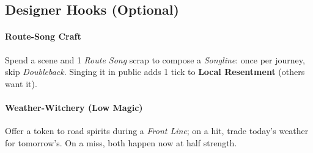 \subsection*{Designer Hooks (Optional)}

\paragraph{Route-Song Craft}
Spend a scene and 1 \emph{Route Song} scrap to compose a \emph{Songline}: once per journey, skip \emph{Doubleback}. Singing it in public adds 1 tick to \textbf{Local Resentment} (others want it).

\paragraph{Weather-Witchery (Low Magic)}
Offer a token to road spirits during a \emph{Front Line}; on a hit, trade today’s weather for tomorrow’s. On a miss, both happen now at half strength.